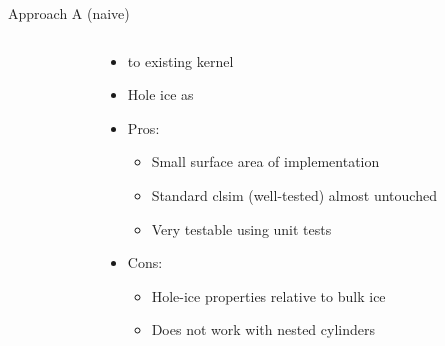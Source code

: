 
\begin{frame}[fragile]{Approach A (naive)}

  \begin{columns}
    \begin{column}{0.5\textwidth}
    \end{column}
    \begin{column}{0.5\textwidth}
      \begin{itemize}
        \item {} to existing kernel
        \item Hole ice as 
        \item Pros:
        \begin{itemize}
          \item Small surface area of implementation
          \item Standard \alert{clsim (well-tested) almost untouched}
          \item Very testable using unit tests
        \end{itemize}
        \item Cons:
        \begin{itemize}
          \item Hole-ice \alert{properties relative} to bulk ice
          \item Does \alert{not work with nested} cylinders
        \end{itemize}
      \end{itemize}
    \end{column}
  \end{columns}


\end{frame}

